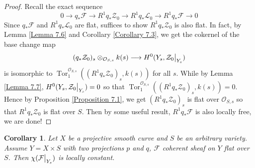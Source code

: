 \documentclass{ctexart}
\newtheorem{corollary}{Corollary}[section]
\newcommand{\tor}{\operatorname{Tor}}
\begin{document}
\begin{proof}
    Recall the exact sequence
    \begin{equation}
        0 \longrightarrow q_{\ast}\mathcal{F} \longrightarrow R^{1}q_{\ast}\mathcal{Z}_{0} \longrightarrow R^{1}q_{\ast}\mathcal{L}_{0} \longrightarrow R^{1}q_{\ast}\mathcal{F} \longrightarrow 0
    \end{equation}
    Since $q_{\ast}\mathcal{F}$ and $R^{1}q_{\ast}\mathcal{L}_{0}$ are flat,
    suffices to show $R^{1}q_{\ast}\mathcal{Z}_{0}$ is also flat.
    In fact, by Lemma \ref{Lemma 7.6} and Corollary \ref{Corollary 7.3},
    we get the cokernel of the base change map
    \begin{equation}
        (q_{\ast}\mathcal{Z}_{0})_{s} \otimes_{\mathcal{O}_{S, s}} k(s) \longrightarrow H^{0}(Y_{s}, \mathcal{Z}_{0}\big{|}_{Y_{s}})
    \end{equation}
    is isomorphic to $\tor_{1}^{\mathcal{O}_{S, s}}((R^{1}q_{\ast}\mathcal{Z}_{0})_{s}, k(s))$ for all $s$.
    While by Lemma \ref{Lemma 7.7}, $H^{0}(Y_{s}, \mathcal{Z}_{0}\big{|}_{Y_{s}}) = 0$ so that $\tor_{1}^{\mathcal{O}_{S, s}}((R^{1}q_{\ast}\mathcal{Z}_{0})_{s}, k(s)) = 0$.
    Hence by Proposition \ref{Proposition 7.1}, we get $(R^{1}q_{\ast}\mathcal{Z}_{0})_{s}$ is flat over $\mathcal{O}_{S, s}$ so that $R^{1}q_{\ast}\mathcal{Z}_{0}$ is flat over $S$.
    Then by some useful result, $R^{1}q_{\ast}\mathcal{F}$ is also locally free, we are done!
\end{proof}
\begin{corollary}
    Let $X$ be a projective smooth curve and $S$ be an arbitrary variety.
    Assume $Y = X \times S$ with two projections $p$ and $q$, $\mathcal{F}$ coherent sheaf on $Y$ flat over $S$.
    Then $\chi(\mathcal{F}\big{|}_{Y_{s}})$ is locally constant.
    \label{Corollary 7.4}
\end{corollary}
\end{document}
